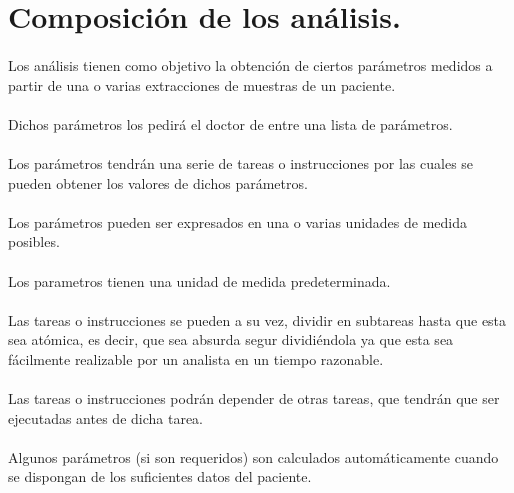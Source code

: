 \documentclass[a4paper,10pt]{article}
\begin{document}
\section{Composición de los análisis.}
\paragraph{}
Los análisis tienen como objetivo la obtención de ciertos parámetros medidos a partir de una o varias extracciones de muestras de un paciente.

\paragraph{}
Dichos parámetros los pedirá el doctor de entre una lista de parámetros.

\paragraph{}
Los parámetros tendrán una serie de tareas o instrucciones por las cuales se pueden obtener los valores de dichos parámetros.

\paragraph{}
Los parámetros pueden ser expresados en una o varias unidades de medida posibles.

\paragraph{}
Los parametros tienen una unidad de medida predeterminada.

\paragraph{}
Las tareas o instrucciones se pueden a su vez, dividir en subtareas hasta que esta sea atómica, es decir, que sea absurda segur dividiéndola ya que esta sea fácilmente realizable por un analista en un tiempo razonable.

\paragraph{}
Las tareas o instrucciones podrán depender de otras tareas, que tendrán que ser ejecutadas antes de dicha tarea.

\paragraph{}
Algunos parámetros (si son requeridos) son calculados automáticamente cuando se dispongan de los suficientes datos del paciente.
\end{document}
